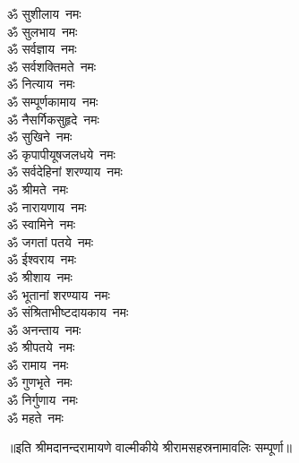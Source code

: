 \begin{multicols}{2}
\begin{flushleft}
ॐ सुशीलाय~नमः\\
ॐ सुलभाय~नमः\\
ॐ सर्वज्ञाय~नमः\\
ॐ सर्वशक्तिमते~नमः\\
ॐ नित्याय~नमः\\
ॐ सम्पूर्णकामाय~नमः\hfill{}\\
ॐ नैसर्गिकसुहृदे~नमः\\
ॐ सुखिने~नमः\\
ॐ कृपापीयूषजलधये~नमः\\
ॐ सर्वदेहिनां शरण्याय~नमः\\
ॐ श्रीमते~नमः\\
ॐ नारायणाय~नमः\\
ॐ स्वामिने~नमः\\
ॐ जगतां पतये~नमः\\
ॐ ईश्वराय~नमः\\
ॐ श्रीशाय~नमः\hfill{}\\
ॐ भूतानां शरण्याय~नमः\\
ॐ संश्रिताभीष्टदायकाय~नमः\\
ॐ अनन्ताय~नमः\\
ॐ श्रीपतये~नमः\\
ॐ रामाय~नमः\\
ॐ गुणभृते~नमः\\
ॐ निर्गुणाय~नमः\\
ॐ महते~नमः\\
\end{flushleft}
\end{multicols}
\centerline{॥इति श्रीमदानन्दरामायणे वाल्मीकीये श्रीरामसहस्रनामावलिः सम्पूर्णा॥}
